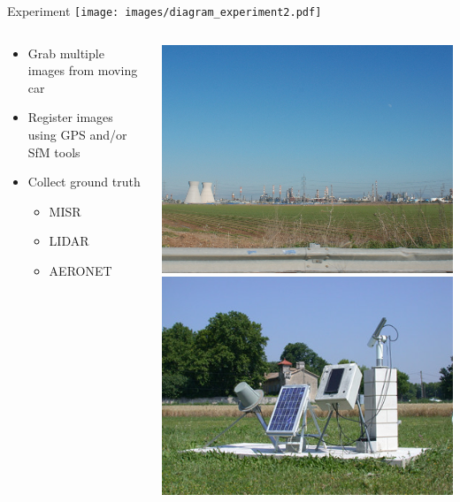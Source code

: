 \documentclass[compress,red,12pt]{beamer}
\begin{document}
\begin{frame}{Experiment}
  {
    \centering
    \texttt{[image: images/diagram\_experiment2.pdf]}    
  }
  {
    \begin{columns}[C]
      \begin{column}{.7\textwidth}
        \begin{itemize}
        \item Grab multiple images from moving car
        \item Register images using GPS and/or SfM tools
        \item Collect ground truth
          \begin{itemize}
          \item MISR
          \item LIDAR
          \item AERONET
          \end{itemize}
        \end{itemize}
      \end{column}
      \begin{column}{.3\textwidth}
        \centering
        \includegraphics[height=0.30\textheight]{DSC_0688.JPG}\\
        \includegraphics[height=0.30\textheight]{AERONET.jpg}
      \end{column}
    \end{columns}
  }
\end{frame}
\end{document}
